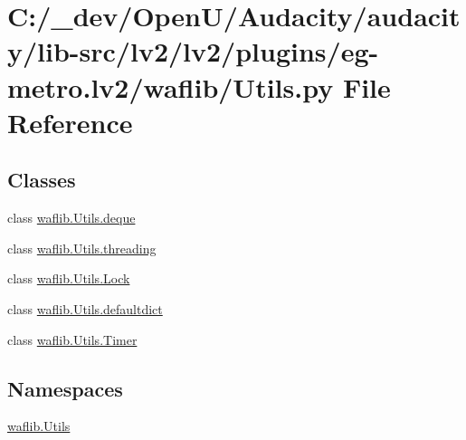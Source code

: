 \hypertarget{lv2_2plugins_2eg-metro_8lv2_2waflib_2_utils_8py}{}\section{C\+:/\+\_\+dev/\+Open\+U/\+Audacity/audacity/lib-\/src/lv2/lv2/plugins/eg-\/metro.lv2/waflib/\+Utils.py File Reference}
\label{lv2_2plugins_2eg-metro_8lv2_2waflib_2_utils_8py}
\subsection*{Classes}
\begin{DoxyCompactItemize}
\item 
class \hyperlink{classwaflib_1_1_utils_1_1deque}{waflib.\+Utils.\+deque}
\item 
class \hyperlink{classwaflib_1_1_utils_1_1threading}{waflib.\+Utils.\+threading}
\item 
class \hyperlink{classwaflib_1_1_utils_1_1_lock}{waflib.\+Utils.\+Lock}
\item 
class \hyperlink{classwaflib_1_1_utils_1_1defaultdict}{waflib.\+Utils.\+defaultdict}
\item 
class \hyperlink{classwaflib_1_1_utils_1_1_timer}{waflib.\+Utils.\+Timer}
\end{DoxyCompactItemize}
\subsection*{Namespaces}
\begin{DoxyCompactItemize}
\item 
 \hyperlink{namespacewaflib_1_1_utils}{waflib.\+Utils}
\end{DoxyCompactItemize}
